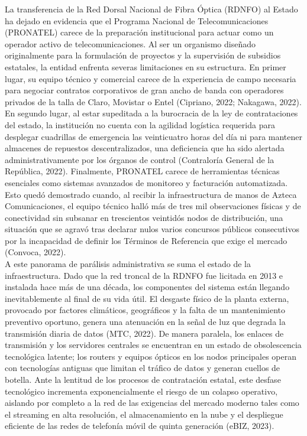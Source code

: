 La transferencia de la Red Dorsal Nacional de Fibra Óptica (RDNFO) al Estado ha dejado en evidencia 
que el Programa Nacional de Telecomunicaciones (PRONATEL) carece de la preparación institucional 
para actuar como un operador activo de telecomunicaciones. Al ser un organismo diseñado originalmente 
para la formulación de proyectos y la supervisión de subsidios estatales, la entidad enfrenta severas 
limitaciones en su estructura. En primer lugar, su equipo técnico y comercial carece de la experiencia de 
campo necesaria para negociar contratos corporativos de gran ancho de banda con operadores privados de 
la talla de Claro, Movistar o Entel (Cipriano, 2022; Nakagawa, 2022). En segundo lugar, al estar 
supeditada a la burocracia de la ley de contrataciones del estado, la institución no cuenta con la agilidad 
logística requerida para desplegar cuadrillas de emergencia las veinticuatro horas del día ni para mantener almacenes de 
repuestos descentralizados, una deficiencia que ha sido alertada administrativamente por los órganos de control 
(Contraloría General de la República, 2022). Finalmente, PRONATEL carece de herramientas técnicas 
esenciales como sistemas avanzados de monitoreo y facturación automatizada. Esto quedó demostrado cuando, al 
recibir la infraestructura de manos de Azteca Comunicaciones, el equipo técnico halló más de tres mil observaciones 
físicas y de conectividad sin subsanar en trescientos veintidós nodos de distribución, una situación que se agravó tras declarar 
nulos varios concursos públicos consecutivos por la incapacidad de definir los Términos de Referencia que exige el mercado (Convoca, 2022).\\

A este panorama de parálisis administrativa se suma el estado de 
la infraestructura. Dado que la red troncal de la RDNFO fue licitada en 2013 e instalada hace más de una década, los 
componentes del sistema están llegando inevitablemente al final de su vida útil. El desgaste físico de la planta externa, 
provocado por factores climáticos, geográficos y la falta de un mantenimiento preventivo oportuno, genera una atenuación en la 
señal de luz que degrada la transmisión diaria de datos (MTC, 2022). De manera paralela, los enlaces de transmisión y los servidores 
centrales se encuentran en un estado de obsolescencia tecnológica latente; los routers y equipos ópticos en los nodos principales operan 
con tecnologías antiguas que limitan el tráfico de datos y generan cuellos de botella. Ante la lentitud de los procesos 
de contratación estatal, este desfase tecnológico incrementa exponencialmente el riesgo de un colapso operativo, aislando por completo a la 
red de las exigencias del mercado moderno tales como el streaming en alta resolución, el almacenamiento en la nube y el despliegue eficiente 
de las redes de telefonía móvil de quinta generación (eBIZ, 2023).\\

